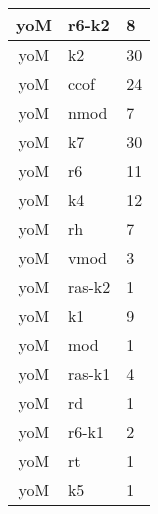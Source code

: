 \documentclass[a4 paper]{article}
\begin{document}
\begin{longtable}{cp{}p{}}
yoM & r6-k2 & 8\\ \midrule yoM & k2 & 30\\ \midrule yoM & ccof & 24\\ \midrule yoM & nmod & 7\\ \midrule yoM & k7 & 30\\ \midrule yoM & r6 & 11\\ \midrule yoM & k4 & 12\\ \midrule yoM & rh & 7\\ \midrule yoM & vmod & 3\\ \midrule yoM & ras-k2 & 1\\ \midrule yoM & k1 & 9\\ \midrule yoM & mod & 1\\ \midrule yoM & ras-k1 & 4\\ \midrule yoM & rd & 1\\ \midrule yoM & r6-k1 & 2\\ \midrule yoM & rt & 1\\ \midrule yoM & k5 & 1\\ \midrule 

\end{longtable}
\end{document}
